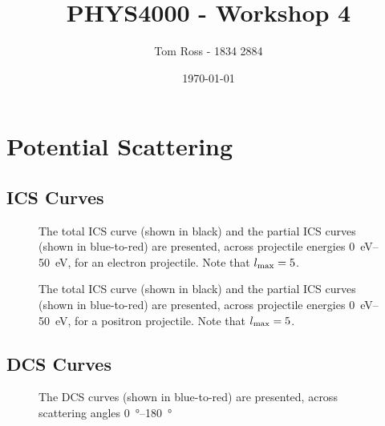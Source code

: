 \documentclass{article}
\title{PHYS4000 - Workshop 4}
\author{Tom Ross - 1834 2884}
\date{\today}
\begin{document}
\tableofcontents

\listoffigures

\listoftables

\clearpage

\section{Potential Scattering}
\label{sec:potential-scattering}

\subsection{ICS Curves}
\label{sec:ics-curves}

\begin{figure}[h]
  \begin{center}
    
  \end{center}
  \caption[Electron ICS Curves]{
    The total ICS curve (shown in black) and the partial ICS curves (shown in
    blue-to-red) are presented, across projectile energies \SIrange{0}{50}{eV},
    for an electron projectile.
    Note that $l_{\rm{max}} = 5$.
  }
  \label{fig:ele-ics-curves}
\end{figure}

\begin{figure}[h]
  \begin{center}
    
  \end{center}
  \caption[Positron ICS Curves]{
    The total ICS curve (shown in black) and the partial ICS curves (shown in
    blue-to-red) are presented, across projectile energies \SIrange{0}{50}{\eV},
    for a positron projectile.
    Note that $l_{\rm{max}} = 5$.
  }
  \label{fig:pos-ics-curves}
\end{figure}

\clearpage

\subsection{DCS Curves}
\label{sec:dcs-curves}

\begin{figure}[h]
  \begin{center}
    
  \end{center}
  \caption[Electron DCS Curves]{
    The DCS curves (shown in blue-to-red) are presented, across scattering
    angles \SIrange{0}{180}{\degree}
  }
  \label{fig:ele-dcs-curves}
\end{figure}
\end{document}
